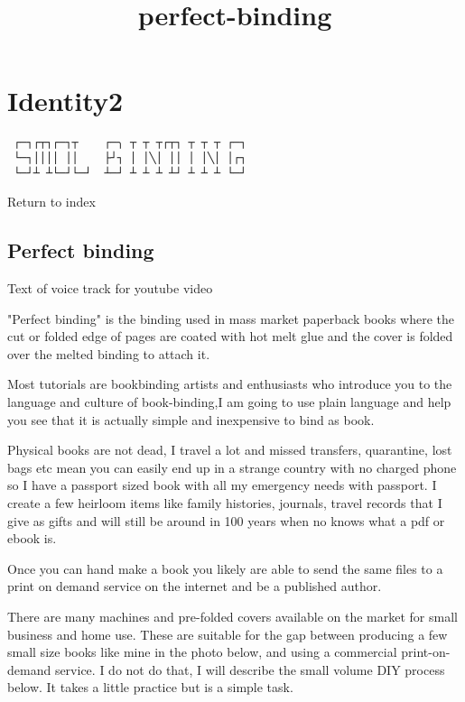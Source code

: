 \documentclass[
]{article}
\title{perfect-binding}
\author{}
\date{}
\begin{document}
\maketitle

\section{Identity2}

\begin{verbatim}
 ┌─┐┌┬┐┌─┐┬    ┌─╮ ┬ ┬ ┬┌┬┐ ┬ ┬ ┬ ┌─┐
 └─┐││││ ││    ├┘┐ │ │╲│ ││ │ │╲│ │┌┐
 └─┘┴ ┴└─┘└─┘  ┴─┘ ┴ ┴ ┴ ┴┘ ┴ ┴ ┴ └─┘ 
\end{verbatim}

Return to index

\subsection{Perfect binding}

Text of voice track for youtube video

"Perfect binding" is the binding used in mass market paperback books
where the cut or folded edge of pages are coated with hot melt glue and
the cover is folded over the melted binding to attach it.

Most tutorials are bookbinding artists and enthusiasts who introduce you
to the language and culture of book-binding,I am going to use plain
language and help you see that it is actually simple and inexpensive to
bind as book.

Physical books are not dead, I travel a lot and missed transfers,
quarantine, lost bags etc mean you can easily end up in a strange
country with no charged phone so I have a passport sized book with all
my emergency needs with passport. I create a few heirloom items like
family histories, journals, travel records that I give as gifts and will
still be around in 100 years when no knows what a pdf or ebook is.

Once you can hand make a book you likely are able to send the same files
to a print on demand service on the internet and be a published author.

There are many machines and pre-folded covers available on the market
for small business and home use. These are suitable for the gap between
producing a few small size books like mine in the photo below, and using
a commercial print-on-demand service. I do not do that, I will describe
the small volume DIY process below. It takes a little practice but is a
simple task.
\end{document}
